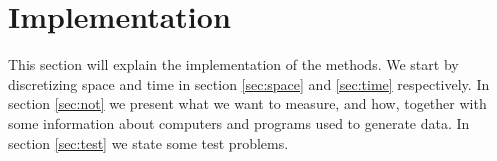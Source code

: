 \chapter{Implementation}%
\label{sec:imp}
This section will explain the implementation of the methods. We start by discretizing space and time in section \ref{sec:space} and \ref{sec:time} respectively.
In section \ref{sec:not} we present what we want to measure, and how, together with some information about computers and programs used to generate data.
In section \ref{sec:test} we state some test problems.

